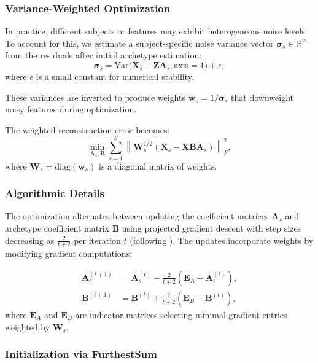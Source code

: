 \documentclass[12pt]{article}
\begin{document}
\subsubsection*{Variance-Weighted Optimization}

In practice, different subjects or features may exhibit heterogeneous noise levels. To account for this, we estimate a subject-specific noise variance vector $\boldsymbol{\sigma}_s \in \mathbb{R}^m$ from the residuals after initial archetype estimation:
\[
\boldsymbol{\sigma}_s = \mathrm{Var}\big( \mathbf{X}_s - \mathbf{Z} \mathbf{A}_s, \text{axis}=1 \big) + \epsilon,
\]
where $\epsilon$ is a small constant for numerical stability.

These variances are inverted to produce weights $\mathbf{w}_s = 1/\boldsymbol{\sigma}_s$ that downweight noisy features during optimization.

The weighted reconstruction error becomes:
\[
\min_{\mathbf{A}_s, \mathbf{B}} \sum_{s=1}^S \left\| \mathbf{W}_s^{1/2} \left(\mathbf{X}_s - \mathbf{X} \mathbf{B} \mathbf{A}_s\right) \right\|_F^2,
\]
where $\mathbf{W}_s = \mathrm{diag}(\mathbf{w}_s)$ is a diagonal matrix of weights.

\subsubsection*{Algorithmic Details}

The optimization alternates between updating the coefficient matrices $\mathbf{A}_s$ and archetype coefficient matrix $\mathbf{B}$ using projected gradient descent with step sizes decreasing as $\frac{2}{t+2}$ per iteration $t$ (following \citealp{BaucEtal15}). The updates incorporate weights by modifying gradient computations:

\begin{align*}
\mathbf{A}_s^{(t+1)} &= \mathbf{A}_s^{(t)} + \frac{2}{t+2} \left( \mathbf{E}_A - \mathbf{A}_s^{(t)} \right), \\
\mathbf{B}^{(t+1)} &= \mathbf{B}^{(t)} + \frac{2}{t+2} \left( \mathbf{E}_B - \mathbf{B}^{(t)} \right),
\end{align*}
where $\mathbf{E}_A$ and $\mathbf{E}_B$ are indicator matrices selecting minimal gradient entries weighted by $\mathbf{W}_s$.

\subsubsection*{Initialization via FurthestSum}
\end{document}
